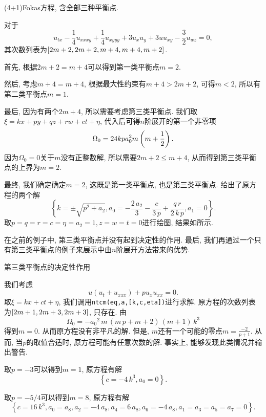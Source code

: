 \begin{example}(4+1)Fokas方程\CITEdaFokas{}, 含全部三种平衡点. 

对于
\begin{equation}
    u_{tx}-\frac{1}{4}u_{xxxy}+\frac{1}{4}u_{xyyy}+3u_xu_y+3uu_{xy}-\frac{3}{2}u_{wz}=0 ,
\end{equation}
其次数列表为$\left[2m+2,2m+2,m+4,m+4,m+2\right]$. 
\begin{compactitem}[\textbullet]
\item 首先, 根据$2m+2=m+4$可以得到第一类平衡点$m=2$.
\item 然后, 考虑$m+4=m+4$, 根据最大性约束有$m+4>2m+2$, 可得$m<2$, 所以有第二类平衡点$m=1$.
\item 最后, 因为有两个$2m+4$, 所以需要考虑第三类平衡点. 我们取$\xi=kx+py+qz+rw+ct+\eta$, 代入后可得$n$阶展开的第一个非零项
\begin{equation}
    \Omega_0 = 24kpa_0^2m\left(m+\frac{1}{2}\right). 
\end{equation}
因为$\Omega_0=0$关于$m$没有正整数解, 所以需要$2m+2\le m+4$, 从而得到第三类平衡点的上界为$m=2$.
\end{compactitem}
   
最终, 我们确定确定$m=2$, 这既是第一类平衡点, 也是第三类平衡点. 给出了原方程的两个解
\begin{equation}
    \left\{ k=\pm \sqrt {{p}^{2}+{{a}_{2}}},{{a}_{0}}=-\frac{2\,{{a}_{2}}}{3}-\frac{c}{3\,p}+ \frac{q\,r}{2\,k\,p},{{a}_{1}}=0\right\} .
\end{equation}
取$p=q=r=c=\eta=a_2=1,z=w=t=0$进行绘图, 结果如所示. 
\end{example}

在之前的例子中, 第三类平衡点并没有起到决定性的作用. 最后, 我们再通过一个只有第三类平衡点的例子来展示中由$n$阶展开方法带来的优势.

\begin{example} 第三类平衡点的决定性作用 

我们考虑
\begin{equation}
    u(u_t+u_{xxx})+pu_x u_{xx}=0.
\end{equation}
取$\xi=kx+ct+\eta$, 我们调用\verb|ntcm(eq,a,[k,c,eta])|进行求解. 原方程的次数列表为$\left[2m+1,2m+3,2m+3\right]$, 只存在\BPthree{}. 由
\begin{equation}
    \Omega_0=-{{{a}_{0}}}^{2}\,m\,\left( m\,p+m+2\right) \,\left( m+1\right) \,{k}^{3}
\end{equation}
得到$m=0$. 从而原方程没有非平凡的解. 但是, $m$还有一个可能的零点$m=\frac{-2}{p+1}$. 从而, 当$p$的取值合适时, 原方程可能有任意次数的解. 事实上, 能够发现此类情况并输出警告. 

取$p=-3$可以得到$m=1$, 原方程有解 
\begin{equation}
    \left\{ c=-4\,{k}^{3},{{a}_{0}}=0\right\} .
\end{equation}

取$p=-5/4$可以得到$m=8$, 原方程有解 
\begin{equation}
    \left\{ c=16\,{k}^{3},{{a}_{0}}={{a}_{8}},{{a}_{2}}=-4\,{{a}_{8}},{{a}_{4}}=6\,{{a}_{8}},{{a}_{6}}=-4\,{{a}_{8}},a_1=a_3=a_5=a_7=0\right\} .
\end{equation}
\end{example}

